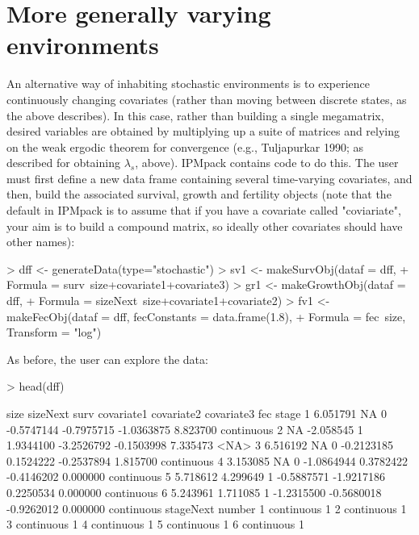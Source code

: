 \documentclass{article}
\begin{document}

\section{More generally varying environments}

An alternative way of inhabiting stochastic environments is to experience continuously changing covariates (rather than moving between discrete states, as the above describes). In this case, rather than building a single megamatrix, desired variables are obtained by multiplying up a suite of matrices and relying on the weak
ergodic theorem for convergence (e.g., Tuljapurkar 1990; as described for obtaining $\lambda_s$, above). IPMpack contains code to do this. The user must first define a new data frame containing several time-varying covariates, and then, build the associated survival, growth and fertility objects (note that the default in IPMpack is to assume that if you have a covariate called "coviariate", your aim is to build a compound matrix, so ideally other covariates should have other names): 
\begin{Schunk}
\begin{Sinput}
> dff <- generateData(type="stochastic")
> sv1 <- makeSurvObj(dataf = dff, 
+                           Formula = surv~size+covariate1+covariate3)
> gr1 <- makeGrowthObj(dataf = dff, 
+                              Formula = sizeNext~size+covariate1+covariate2)
> fv1 <- makeFecObj(dataf = dff, fecConstants = data.frame(1.8), 
+                   Formula = fec~size, Transform = "log")
\end{Sinput}
\end{Schunk}
As before, the user can explore the data: 
\begin{Schunk}
\begin{Sinput}
> head(dff)
\end{Sinput}
\begin{Soutput}
      size  sizeNext surv covariate1 covariate2 covariate3      fec      stage
1 6.051791        NA    0 -0.5747144 -0.7975715 -1.0363875 8.823700 continuous
2       NA -2.058545    1  1.9344100 -3.2526792 -0.1503998 7.335473       <NA>
3 6.516192        NA    0 -0.2123185  0.1524222 -0.2537894 1.815700 continuous
4 3.153085        NA    0 -1.0864944  0.3782422 -0.4146202 0.000000 continuous
5 5.718612  4.299649    1 -0.5887571 -1.9217186  0.2250534 0.000000 continuous
6 5.243961  1.711085    1 -1.2315500 -0.5680018 -0.9262012 0.000000 continuous
   stageNext number
1 continuous      1
2 continuous      1
3 continuous      1
4 continuous      1
5 continuous      1
6 continuous      1
\end{Soutput}
\end{Schunk}
\end{document}
